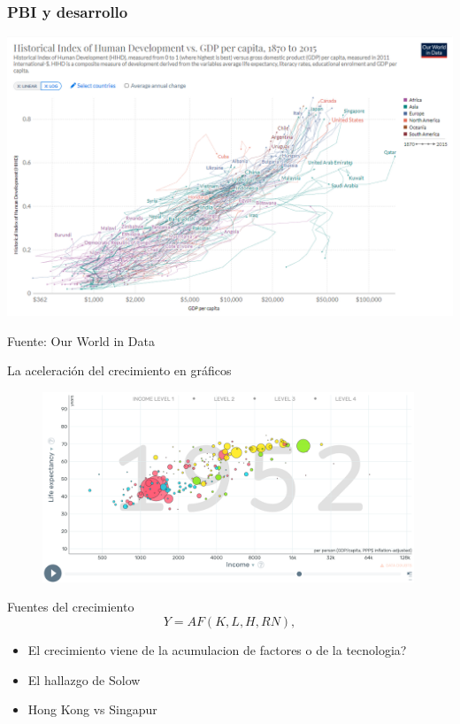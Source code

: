 \documentclass{beamer}
\begin{document}
\begin{frame}
\frametitle{ PBI y desarrollo}
\begin{center}
    \href{https://ourworldindata.org/grapher/hdi-vs-gdp-per-capita} {\includegraphics[scale=0.35]{Tema_11.27_hdi_2.png}}
\end{center}
Fuente: Our World in Data
\end{frame}

\begin{frame}{ La aceleración del crecimiento en gráficos}
    \begin{figure}[htp]
\href{https://www.gapminder.org/tools/} {\includegraphics[width=0.99\textwidth]{Figures/Gapminder.png}} 
\end{figure}
\end{frame}

\begin{frame}{Fuentes del crecimiento}
   \begin{equation}
    Y = AF(K,L,H,RN),
\end{equation} 
\begin{itemize}
    \item El crecimiento viene de la acumulacion de factores o de la tecnologia?
    \item El hallazgo de Solow
    \item Hong Kong vs Singapur
\end{itemize}
\end{frame}
\end{document}
